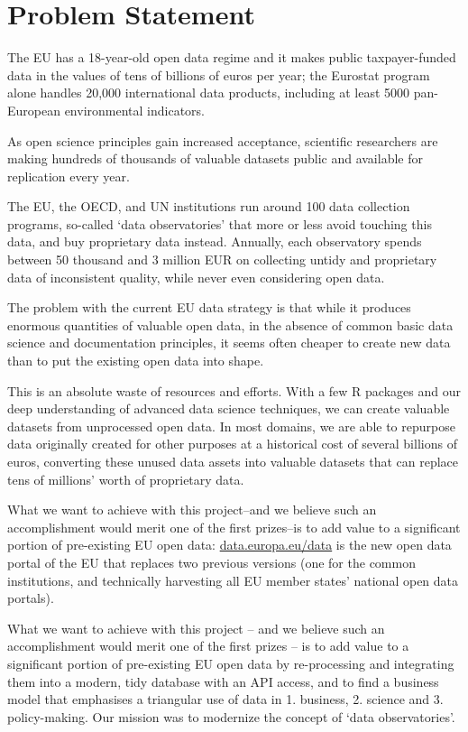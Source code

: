 \documentclass[
  a4paper,
  openany, a4paper, oneside]{book}
\begin{document}
\hypertarget{problem-statement}{%
\section*{Problem Statement}\label{problem-statement}}

The EU has a 18-year-old open data regime and it makes public taxpayer-funded data in the values of tens of billions of euros per year; the Eurostat program alone handles 20,000 international data products, including at least 5000 pan-European environmental indicators.

As open science principles gain increased acceptance, scientific researchers are making hundreds of thousands of valuable datasets public and available for replication every year.

The EU, the OECD, and UN institutions run around 100 data collection programs, so-called `data observatories' that more or less avoid touching this data, and buy proprietary data instead. Annually, each observatory spends between 50 thousand and 3 million EUR on collecting untidy and proprietary data of inconsistent quality, while never even considering open data.

The problem with the current EU data strategy is that while it produces enormous quantities of valuable open data, in the absence of common basic data science and documentation principles, it seems often cheaper to create new data than to put the existing open data into shape.

This is an absolute waste of resources and efforts. With a few R packages and our deep understanding of advanced data science techniques, we can create valuable datasets from unprocessed open data. In most domains, we are able to repurpose data originally created for other purposes at a historical cost of several billions of euros, converting these unused data assets into valuable datasets that can replace tens of millions' worth of proprietary data.

What we want to achieve with this project--and we believe such an accomplishment would merit one of the first prizes--is to add value to a significant portion of pre-existing EU open data:
\href{https://data.europa.eu/data/}{data.europa.eu/data} is the new open data portal of the EU that replaces two previous versions (one for the common institutions, and technically harvesting all EU member states' national open data portals).

What we want to achieve with this project -- and we believe such an accomplishment would merit one of the first prizes -- is to add value to a significant portion of pre-existing EU open data by re-processing and integrating them into a modern, tidy database with an API access, and to find a business model that emphasises a triangular use of data in 1. business, 2. science and 3. policy-making. Our mission was to modernize the concept of `data observatories'.
\end{document}
